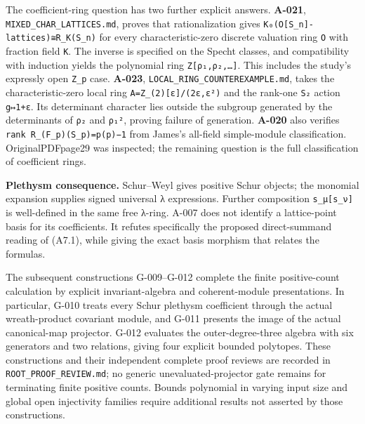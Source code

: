 \documentclass[
  10pt,
]{article}
\begin{document}
The coefficient-ring question has two further explicit answers.
\textbf{A-021},
\texttt{\small MIXED\_\allowbreak{}CHAR\_\allowbreak{}LATTICES.md},
proves that rationalization gives
\texttt{\small K₀(\allowbreak{}O[\allowbreak{}S\_\allowbreak{}n]\allowbreak{}-\allowbreak{}lattices)\allowbreak{}≅R\_\allowbreak{}K(\allowbreak{}S\_\allowbreak{}n)\allowbreak{}}
for every characteristic-zero discrete valuation ring \texttt{\small O}
with fraction field \texttt{\small K}. The inverse is specified on the
Specht classes, and compatibility with induction yields the polynomial
ring
\texttt{\small Z[\allowbreak{}ρ₁,\allowbreak{}ρ₂,\allowbreak{}…]\allowbreak{}}.
This includes the study's expressly open
\texttt{\small Z\_\allowbreak{}p} case. \textbf{A-023},
\texttt{\small LOCAL\_\allowbreak{}RING\_\allowbreak{}COUNTEREXAMPLE.md},
takes the characteristic-zero local ring
\texttt{\small A=\allowbreak{}Z\_\allowbreak{}(\allowbreak{}2)\allowbreak{}[\allowbreak{}ε]\allowbreak{}/\allowbreak{}(\allowbreak{}2ε,\allowbreak{}ε²)\allowbreak{}}
and the rank-one \texttt{\small S₂} action
\texttt{\small g↦1+\allowbreak{}ε}. Its determinant character lies
outside the subgroup generated by the determinants of \texttt{\small ρ₂}
and \texttt{\small ρ₁²}, proving failure of generation. \textbf{A-020}
also verifies
\texttt{\small rank R\_\allowbreak{}(\allowbreak{}F\_\allowbreak{}p)\allowbreak{}(\allowbreak{}S\_\allowbreak{}p)\allowbreak{}=\allowbreak{}p(\allowbreak{}p)\allowbreak{}−1}
from James's all-field simple-module classification. OriginalPDFpage29
was inspected; the remaining question is the full classification of
coefficient rings.

\textbf{Plethysm consequence.} Schur--Weyl gives positive Schur objects;
the monomial expansion supplies signed universal λ expressions. Further
composition
\texttt{\small s\_\allowbreak{}μ[\allowbreak{}s\_\allowbreak{}ν]\allowbreak{}}
is well-defined in the same free λ-ring. A-007 does not identify a
lattice-point basis for its coefficients. It refutes specifically the
proposed direct-summand reading of (A7.1), while giving the exact basis
morphism that relates the formulas.

The subsequent constructions G-009--G-012 complete the finite
positive-count calculation by explicit invariant-algebra and
coherent-module presentations. In particular, G-010 treats every Schur
plethysm coefficient through the actual wreath-product covariant module,
and G-011 presents the image of the actual canonical-map projector.
G-012 evaluates the outer-degree-three algebra with six generators and
two relations, giving four explicit bounded polytopes. These
constructions and their independent complete proof reviews are recorded
in \texttt{\small ROOT\_\allowbreak{}PROOF\_\allowbreak{}REVIEW.md}; no
generic unevaluated-projector gate remains for terminating finite
positive counts. Bounds polynomial in varying input size and global open
injectivity families require additional results not asserted by those
constructions.
\end{document}
